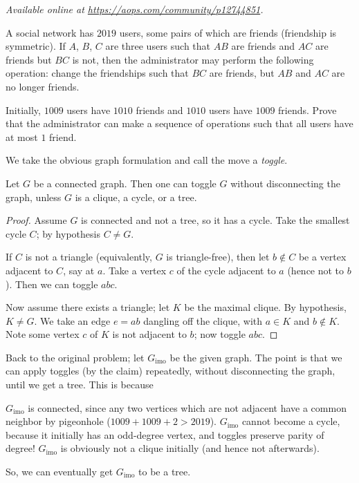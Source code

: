 \textsl{Available online at \url{https://aops.com/community/p12744851}.}
\begin{mdframed}[style=mdpurplebox,frametitle={Problem statement}]
A social network has $2019$ users, some pairs of which are friends (friendship is symmetric).
If $A$, $B$, $C$ are three users such that $AB$ are friends and $AC$ are friends but $BC$ is not,
then the administrator may perform the following operation:
change the friendships such that $BC$ are friends, but $AB$ and $AC$ are no longer friends.

Initially, $1009$ users have $1010$ friends and $1010$ users have $1009$ friends.
Prove that the administrator can make a sequence of operations
such that all users have at most $1$ friend.
\end{mdframed}
We take the obvious graph formulation
and call the move a \emph{toggle}.

\begin{claim*}
  Let $G$ be a connected graph.
  Then one can toggle $G$ without disconnecting the graph,
  unless $G$ is a clique, a cycle, or a tree.
\end{claim*}
\begin{proof}
  Assume $G$ is connected and not a tree, so it has a cycle.
  Take the smallest cycle $C$; by hypothesis $C \neq G$.

  If $C$ is not a triangle (equivalently, $G$ is triangle-free),
  then let $b \notin C$ be a vertex adjacent to $C$, say at $a$.
  Take a vertex $c$ of the cycle adjacent to $a$ (hence not to $b$).
  Then we can toggle $abc$.

  Now assume there exists a triangle; let $K$ be the maximal clique.
  By hypothesis, $K \neq G$.
  We take an edge $e = ab$ dangling off the clique,
  with $a \in K$ and $b \notin K$.
  Note some vertex $c$ of $K$ is not adjacent to $b$; now toggle $abc$.
\end{proof}

Back to the original problem;
let $G_{\text{imo}}$ be the given graph.
The point is that we can apply toggles (by the claim) repeatedly,
without disconnecting the graph, until we get a tree.
This is because
\begin{itemize}
  \ii $G_{\text{imo}}$ is connected,
  since any two vertices which are not adjacent
  have a common neighbor by pigeonhole
  ($1009 + 1009 + 2 > 2019$).
  \ii $G_{\text{imo}}$ cannot become a cycle,
  because it initially has an odd-degree vertex,
  and toggles preserve parity of degree!
  \ii $G_{\text{imo}}$ is obviously not a clique initially
  (and hence not afterwards).
\end{itemize}
So, we can eventually get $G_{\text{imo}}$ to be a tree.

